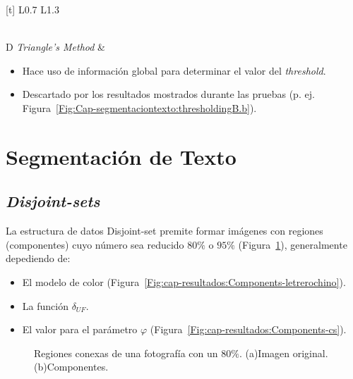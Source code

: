 \begin{center}
\begin{table}[H]
\begin{tabularx}{\textwidth}[t]{ L{0.7}  L{1.3} }
\begin{minipage}[t]{1.3\linewidth}
\begin{itemize}
\end{itemize}
\end{minipage}\\
\hline
D \textit{Triangle's Method} &
\begin{minipage}[t]{1.3\linewidth}%
\begin{itemize}
\item[D.1] Hace uso de información global para determinar el valor del \textit{threshold}.
\item[D.2] Descartado por los resultados mostrados durante las pruebas (p. ej. Figura~\ref{Fig:Cap-segmentaciontexto:thresholdingB.b}).\\
\end{itemize}
\end{minipage}
\end{tabularx}
\caption{Análisis entre las técnicas consideradas durante la fase de 
pre-Procesamiento, sub-fase \textit{Thresholding}}
\label{tab:Cap-resultados:Comparativo:Thresholding}
\end{table}
\end{center}

\section{Segmentación de Texto}
\subsection{\textit{Disjoint-sets}}
La estructura de datos Disjoint-set premite formar imágenes con regiones 
(componentes) cuyo número sea reducido $80\%$ o $95\%$
(Figura~\ref{Fig:cap-resultados:Components-amargura}), generalmente depediendo
de:
\begin{itemize}
	\item El modelo de color (Figura~\ref{Fig:cap-resultados:Components-letrerochino}).
	\item La función $\delta_{UF}$.
	\item El valor para el parámetro $\varphi$ (Figura~\ref{Fig:cap-resultados:Components-cs}).
\end{itemize}

\begin{figure}[h!]
  \centering
   { }
  \caption[Regiones conexas de una fotografía]{Regiones conexas de una
  fotografía con un $80\%$. (a)Imagen original. (b)Componentes.}
  \label{Fig:cap-resultados:Components-amargura}
\end{figure}

